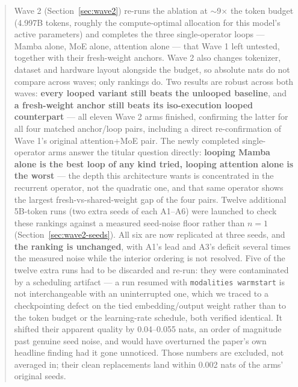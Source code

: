 \documentclass[11pt,a4paper]{article}
\begin{document}
\begin{abstract}
Wave 2 (Section~\ref{sec:wave2}) re-runs the ablation at $\sim$9$\times$ the token budget (4.997B
tokens, roughly the compute-optimal allocation for this model's active parameters) and completes
the three single-operator loops --- Mamba alone, MoE alone, attention alone --- that Wave 1 left
untested, together with their fresh-weight anchors. Wave 2 also changes tokenizer, dataset and
hardware layout alongside the budget, so absolute nats do not compare across waves; only rankings
do. Two results are robust across both waves: \textbf{every looped variant still beats the unlooped
baseline}, and \textbf{a fresh-weight anchor still beats its iso-execution looped counterpart} ---
all eleven Wave 2 arms finished, confirming the latter for all four matched anchor/loop pairs,
including a direct re-confirmation of Wave 1's original attention+MoE pair. The newly completed
single-operator arms answer the titular question directly: \textbf{looping Mamba alone is the best
loop of any kind tried, looping attention alone is the worst} --- the depth this architecture wants
is concentrated in the recurrent operator, not the quadratic one, and that same operator shows the
largest fresh-vs-shared-weight gap of the four pairs. Twelve additional 5B-token runs (two extra
seeds of each A1--A6) were launched to check these rankings against a measured seed-noise floor
rather than $n=1$ (Section~\ref{sec:wave2-seeds}). All six are now replicated at three seeds, and
\textbf{the ranking is unchanged}, with A1's lead and A3's deficit several times the measured noise
while the interior ordering is not resolved. Five of the twelve extra runs had to be discarded and
re-run: they were contaminated by a scheduling artifact --- a run resumed with \texttt{modalities
warmstart} is not interchangeable with an uninterrupted one, which we traced to a checkpointing
defect on the tied embedding/output weight rather than to the token budget or the learning-rate
schedule, both verified identical. It shifted their apparent quality by 0.04--0.055 nats, an order
of magnitude past genuine seed noise, and would have overturned the paper's own headline finding had
it gone unnoticed. Those numbers are excluded, not averaged in; their clean replacements land within
0.002 nats of the arms' original seeds.


\end{abstract}
\end{document}
